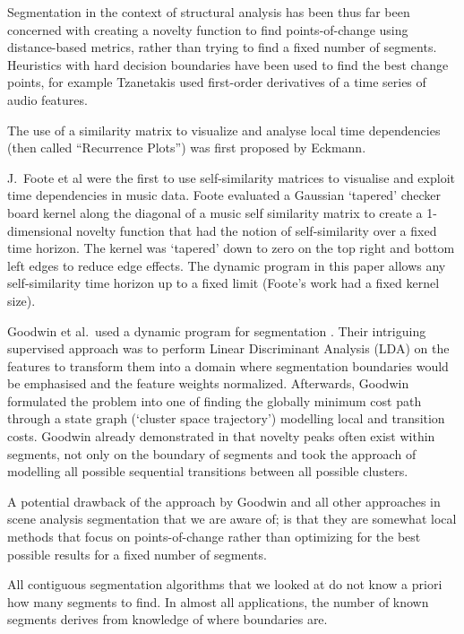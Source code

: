 \documentclass[twocolumn]{article}
\begin{document}
	Segmentation in the context of structural analysis has been thus far been concerned with creating a novelty function to find points-of-change using distance-based metrics, rather than trying to find a fixed number of segments. Heuristics with hard decision boundaries have been used to find the best change points, for example Tzanetakis \cite{tzanetakis1999framework} used first-order derivatives of a time series of audio features. 
	
	The use of a similarity matrix to visualize and analyse local time dependencies (then called ``Recurrence Plots'') was first proposed by Eckmann\citep{eckmann1987recurrence}.
	
	J.\ Foote et al \citep{foote1999visualizing,foote1997similarity,foote2000automatic,foote2003media,foote2001visualizing} were the first to use self-similarity matrices to visualise and exploit time dependencies in music data. Foote evaluated a Gaussian `tapered' checker board kernel along the diagonal of a music self similarity matrix to create a 1-dimensional novelty function that had the notion of self-similarity over a fixed time horizon. The kernel was `tapered' down to zero on the top right and bottom left edges to reduce edge effects. The dynamic program in this paper allows any self-similarity time horizon up to a fixed limit (Foote's work had a fixed kernel size).
	
	Goodwin et al.\ used a dynamic program for segmentation \citep{goodwin2004dynamic}. Their intriguing supervised approach was to perform Linear Discriminant Analysis (LDA) on the features to transform them into a domain where segmentation boundaries would be emphasised and the feature weights normalized. Afterwards, Goodwin formulated the problem into one of finding the globally minimum cost path through a state graph (`cluster space trajectory') modelling local and transition costs. Goodwin already demonstrated in \citep{goodwin2003audio} that novelty peaks often exist within segments, not only on the boundary of segments and took the approach of modelling all possible sequential transitions between all possible clusters.
	
	A potential drawback of the approach by Goodwin and all other approaches in scene analysis segmentation that we are aware of; is that they are somewhat local methods that focus on points-of-change rather than optimizing for the best possible results for a fixed number of segments. 
	
	All contiguous segmentation algorithms that we looked at do not know a priori how many segments to find. In almost all applications, the number of known segments derives from knowledge of where boundaries are. 
	
\end{document}
